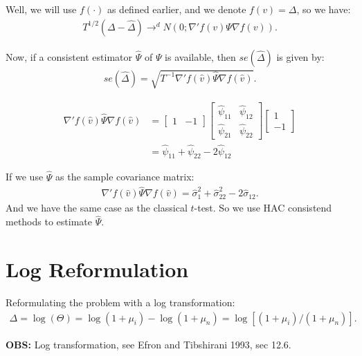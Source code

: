 \documentclass[12pt,oneside,a4paper]{article}
\begin{document}
Well, we will use $f(\cdot)$ as defined earlier, and we denote $f(v) = \Delta$, so we have:
\begin{align*}
T^{1/2}(\Delta - \hat{\Delta}) 	\to^d N \left( 0; \nabla'f(v) \Psi \nabla f(v)  \right).
\end{align*}

Now, if a consistent estimator $\hat{\Psi}$ of $\Psi$ is available, then $se(\hat{\Delta})$ is given by:
\begin{align}
	se(\hat{\Delta}) = \sqrt{T^{-1} \nabla'f(\hat{v}) \hat{\Psi} \nabla f(\hat{v})}.
\end{align}

% 
\begin{align*}
\nabla'f(\hat{v}) \hat{\Psi} \nabla f(\hat{v})&=
\begin{bmatrix} 1 & -1 \end{bmatrix}
\begin{bmatrix}
\hat{\psi}_{11} &  \hat{\psi}_{12}
\\            
\hat{\psi}_{21} &  \hat{\psi}_{22}
\end{bmatrix}
\begin{bmatrix} 1 \\  -1 \end{bmatrix}
\\
&= \hat{\psi}_{11} + \hat{\psi}_{22} -2\hat{\psi}_{12}
\end{align*}

If we use $\hat{\Psi}$ as the sample covariance matrix:
\begin{align*}
\nabla'f(\hat{v}) \hat{\Psi} \nabla f(\hat{v})= \hat{\sigma}_{1}^2 + \hat{\sigma}_{22}^{2} -2\hat{\sigma}_{12}.
\end{align*}
And we have the same case as the classical $t$-test.
So we use HAC consistend methods to estimate $\hat{\Psi}$.

\clearpage
\section{Log Reformulation}

Reformulating the problem with a log transformation: 
\begin{align}
\Delta = \log(\Theta) =
\log(1+\mu_{i}) - \log(1+\mu_{n})  =
\log[(1+\mu_{i})/(1+\mu_{n})].
\end{align}

\noindent
{\footnotesize
\textbf{OBS:} Log transformation, see Efron and Tibshirani 1993, sec 12.6.}
\vspace{1 em}
\end{document}
